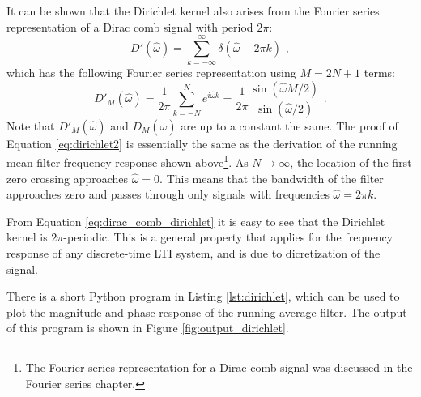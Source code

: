 It can be shown that the Dirichlet kernel also arises from the Fourier
series representation of a Dirac comb signal with period $2\pi$:
\begin{equation}
D'(\hat{\omega}) = \sum_{k=-\infty}^{\infty} \delta(\hat{\omega}-2\pi k) \,\,,
\label{eq:dirac_comb_dirichlet}
\end{equation}
which has the following Fourier series representation using $M=2N+1$ terms:
\begin{equation}
D'_M(\hat{\omega}) = \frac{1}{2\pi}\sum_{k=-N}^{N} e^{i \hat{\omega} k} = \frac{1}{2\pi}\frac{ \sin(\hat{\omega}M/2) }{\sin(\hat{\omega}/2)} \,\,.
\label{eq:dirichlet2}
\end{equation}
Note that $D'_M(\hat{\omega})$ and $D_M(\hat{\omega})$ are up to a
constant the same. The proof of Equation \ref{eq:dirichlet2} is
essentially the same as the derivation of the running mean filter
frequency response shown above\footnote{The Fourier series
representation for a Dirac comb signal was discussed in the Fourier
series chapter.}. As $N\rightarrow \infty$, the location of the first
zero crossing approaches $\hat{\omega}=0$. This means that the
bandwidth of the filter approaches zero and passes through only
signals with frequencies $\hat{\omega}=2\pi k$.

From Equation \ref{eq:dirac_comb_dirichlet} it is easy to see that the Dirichlet kernel is $2\pi$-periodic. This is a general property that
applies for the frequency response of any discrete-time LTI system,
and is due to dicretization of the signal.

There is a short Python program in Listing \ref{lst:dirichlet}, which
can be used to plot the magnitude and phase response of the running
average filter. The output of this program is shown in
Figure \ref{fig:output_dirichlet}.

